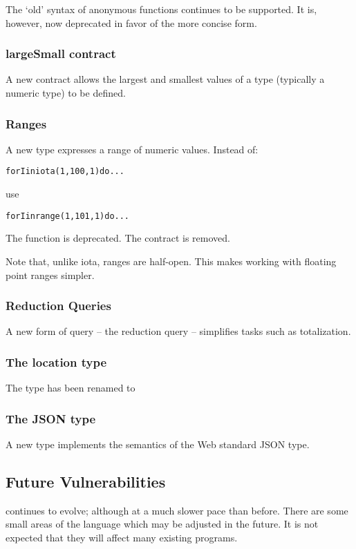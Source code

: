 \begin{aside}
The `old' syntax of anonymous functions continues to be supported. It is, however, now deprecated in favor of the more concise form.
\end{aside}

\subsubsection{largeSmall contract}
A new contract  allows the largest and smallest values of a type (typically a numeric type) to be defined.

\subsubsection{Ranges}
A new type  expresses a range of numeric values. Instead of:
\begin{alltt}
for I in iota(1,100,1) do ...
\end{alltt}
use
\begin{alltt}
for I in range(1,101,1) do ...
\end{alltt}
The  function is deprecated. The  contract is removed.

Note that, unlike iota, ranges are half-open. This makes working with floating point ranges simpler.

\subsubsection{Reduction Queries}
A new form of query -- the reduction query -- simplifies tasks such as totalization.

\subsubsection{The location type}
The  type has been renamed to 

\subsubsection{The JSON type}
A new type  implements the semantics of the Web standard JSON type.

\subsection{Future Vulnerabilities}
\Sr continues to evolve; although at a much slower pace than before. There are some small areas of the language which may be adjusted in the future. It is not expected that they will affect many existing programs.

